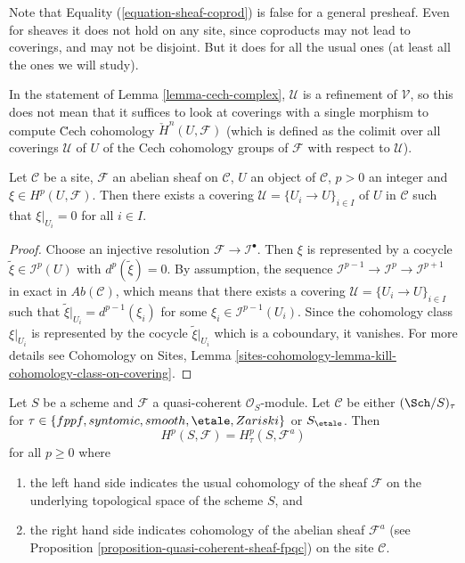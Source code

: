 \noindent
Note that Equality (\ref{equation-sheaf-coprod})
is false for a general presheaf. Even for sheaves it does not hold on any
site, since coproducts may not lead to coverings, and may not be disjoint.
But it does for all the usual ones (at least all the ones we will study).

\begin{remark}
\label{remark-refinement}
In the statement of
Lemma \ref{lemma-cech-complex},
$\mathcal{U}$ is a refinement of $\mathcal{V}$,
so this does not mean that it suffices to look at coverings with a single
morphism to compute \u Cech cohomology $\check H^n(U, \mathcal{F})$ (which
is defined as the colimit over all coverings $\mathcal{U}$ of $U$ of the
Cech cohomology groups of $\mathcal{F}$ with respect to $\mathcal{U}$).
\end{remark}

\begin{lemma}
\label{lemma-locality-cohomology}
Let $\mathcal{C}$ be a site, $\mathcal{F}$ an abelian sheaf on $\mathcal{C}$,
$U$ an object of $\mathcal{C}$, $p >0$ an integer and $\xi \in
H^p(U, \mathcal{F})$. Then there exists a covering
$\mathcal{U} = \{U_i \to U\}_{i \in I}$ of $U$ in $\mathcal{C}$
such that $\xi |_{U_i} = 0$ for all $i \in I$.
\end{lemma}

\begin{proof}
Choose an injective resolution $\mathcal{F} \to \mathcal{I}^\bullet$. Then
$\xi$ is represented by a cocycle $\tilde{\xi} \in \mathcal{I}^p(U)$
with $d^p(\tilde{\xi}) = 0$. By assumption, the sequence
$\mathcal{I}^{p - 1} \to \mathcal{I}^p \to \mathcal{I}^{p + 1}$ in exact in
$\textit{Ab}(\mathcal{C})$, which means that there exists a covering
$\mathcal{U} = \{U_i \to U\}_{i \in I}$ such that
$\tilde{\xi}|_{U_i} = d^{p - 1}(\xi_i)$ for some
$\xi_i \in \mathcal{I}^{p-1}(U_i)$. Since
the cohomology class $\xi|_{U_i}$ is represented by the cocycle
$\tilde{\xi}|_{U_i}$ which is a coboundary, it vanishes.
For more details see
Cohomology on Sites,
Lemma \ref{sites-cohomology-lemma-kill-cohomology-class-on-covering}.
\end{proof}

\begin{theorem}
\label{theorem-zariski-fpqc-quasi-coherent}
Let $S$ be a scheme and $\mathcal{F}$ a quasi-coherent $\mathcal{O}_S$-module.
Let $\mathcal{C}$ be either $(\Sch/S)_\tau$ for
$\tau \in \{fppf, syntomic, smooth, \etale, Zariski\}$ or
$S_\etale$. Then
$$
H^p(S, \mathcal{F}) = H^p_\tau(S, \mathcal{F}^a)
$$
for all $p \geq 0$ where
\begin{enumerate}
\item the left hand side indicates the usual cohomology of the sheaf
$\mathcal{F}$ on the underlying topological space of the scheme $S$, and
\item the right hand side indicates cohomology
of the abelian sheaf $\mathcal{F}^a$ (see
Proposition \ref{proposition-quasi-coherent-sheaf-fpqc})
on the site $\mathcal{C}$.
\end{enumerate}
\end{theorem}

